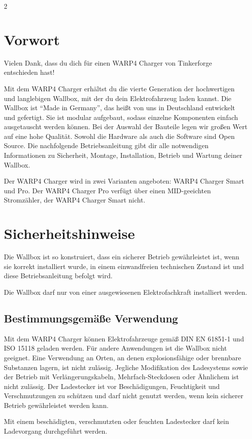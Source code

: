 \documentclass[a4paper,10pt]{article}
\newcommand{\hint}[1]{\begin{tcolorbox}[colback=boxgray,colframe=black,coltext=
white,title=Hinweis,left*=2mm,right*=2mm,boxsep=1mm,bottom=1mm,top=1mm]#1\end{tcolorbox}}
\begin{document}
\begin{multicols*}{2}
    \tableofcontents
    \newpage
    \section{Vorwort}
	Vielen Dank, dass du dich für einen WARP4 Charger von Tinkerforge entschieden hast!

    Mit dem WARP4 Charger
    erhältst du die vierte Generation der hochwertigen und langlebigen Wallbox,
    mit der du dein Elektrofahrzeug laden kannst.
    Die Wallbox ist \enquote{Made in Germany}, das heißt von uns in
	Deutschland entwickelt und gefertigt. Sie ist modular aufgebaut, sodass
    einzelne Komponenten einfach ausgetauscht werden können. Bei der Auswahl der
	Bauteile legen wir großen Wert auf eine hohe Qualität. Sowohl die Hardware als
    auch die Software sind Open Source. Die nachfolgende Betriebsanleitung gibt dir
    alle notwendigen Informationen zu Sicherheit, Montage, Installation, Betrieb
    und Wartung deiner Wallbox.
	\par
	Der WARP4 Charger wird in zwei Varianten
	angeboten: WARP4 Charger Smart und Pro. Der WARP4 Charger Pro verfügt über einen MID-geeichten Stromzähler, der WARP4 Charger Smart nicht.

    \section{Sicherheitshinweise}
    Die Wallbox ist so konstruiert, dass ein sicherer Betrieb gewährleistet ist,
    wenn sie korrekt installiert wurde, in einem einwandfreien technischen Zustand
    ist und diese Betriebsanleitung befolgt wird. \hint{Die Wallbox darf nur von einer ausgewiesenen Elektrofachkraft installiert
        werden.}

    \subsection{Bestimmungsgemäße Verwendung}
    Mit dem WARP4 Charger können Elektrofahrzeuge gemäß DIN EN 61851-1 und
	ISO 15118 geladen werden. Für andere Anwendungen ist die Wallbox nicht geeignet. Eine Verwendung
    an Orten, an denen explosionsfähige oder brennbare Substanzen lagern, ist nicht
    zulässig. Jegliche Modifikation des Ladesystems sowie der Betrieb mit
    Verlängerungskabeln, Mehrfach-Steckdosen oder Ähnlichem ist nicht zulässig. Der
    Ladestecker ist vor Beschädigungen, Feuchtigkeit und Verschmutzungen zu
    schützen und darf nicht genutzt werden, wenn kein sicherer Betrieb
    gewährleistet werden kann. \hint{Mit einem beschädigten, verschmutzten oder feuchten Ladestecker darf kein Ladevorgang durchgeführt
        werden.}


\end{multicols*}
\end{document}
